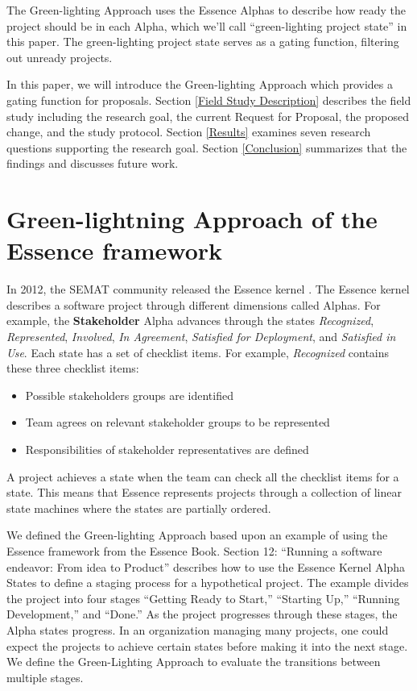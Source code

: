 The Green-lighting Approach
uses the Essence Alphas to describe how ready the project should be in
each Alpha, which we'll call ``green-lighting project state'' in this
paper. The green-lighting project state serves as a gating function,
filtering out unready projects.

In this paper, we will introduce the Green-lighting Approach which
provides a gating function for proposals. Section
\ref{Field Study Description} describes the field study
including the research goal, the current Request for Proposal, the
proposed change, and the study protocol. Section
\ref{Results} examines seven research questions
supporting the research goal. Section \ref{Conclusion}
summarizes that the findings and discusses future work.


\section{Green-lightning Approach of the Essence framework}
\label{Green-lightning Approach of the Essence framework}

In 2012, the SEMAT community released the Essence kernel
\cite{OMGStandard}. The Essence kernel describes a
software project through different dimensions called Alphas. For
example, the \textbf{Stakeholder} Alpha advances through the states
\textit{Recognized}, \textit{Represented}, \textit{Involved}, 
\textit{In Agreement}, \textit{Satisfied for Deployment}, and \textit{Satisfied in Use}. Each state has a set of checklist items. For example, \textit{Recognized} contains these three checklist items:

\begin{itemize}
\itemsep1pt\parskip0pt
\item
  Possible stakeholders groups are identified
\item
  Team agrees on relevant stakeholder groups to be represented
\item
  Responsibilities of stakeholder representatives are defined
\end{itemize}

A project achieves a state when the team can check all the checklist
items for a state. This means that Essence represents projects through a
collection of linear state machines where the states are partially
ordered.

We defined the Green-lighting Approach based upon an example of using
the Essence framework from the Essence Book. Section 12: ``Running a
software endeavor: From idea to Product''
\cite{EssenceBook} describes how to use the Essence
Kernel Alpha States to define a staging process for a hypothetical
project. The example divides the project into four stages ``Getting
Ready to Start,'' ``Starting Up,'' ``Running Development,'' and
``Done.'' As the project progresses through these stages, the Alpha
states progress. In an organization managing many projects, one could
expect the projects to achieve certain states before making it into the
next stage. We define the Green-Lighting Approach to evaluate the
transitions between multiple stages.

